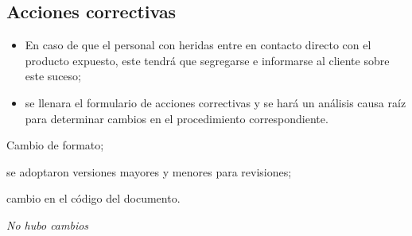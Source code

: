 \subsection{Acciones correctivas}
\begin{itemize}
	\item En caso de que el personal con heridas entre en contacto directo con el producto expuesto, este tendrá que segregarse e informarse al cliente sobre este suceso;
	\item se llenara el formulario de acciones correctivas y se hará un análisis causa raíz para determinar cambios en el procedimiento correspondiente.
\end{itemize}

\begin{changelog}[simple, sectioncmd=\subsection*,label=changelog-1.8]
	\begin{version}[v=2.1, date=2023--01, author=Pablo E. Alanis]
			\item Cambio de formato;
			\item se adoptaron versiones mayores y menores para revisiones;
			\item cambio en el código del documento.
	\end{version}

	\begin{version}[v=1.8, date=2022-05, author=Alonso M.]
		\item \textit{No hubo cambios}
	\end{version}
\end{changelog}

\pagestyle{formato}